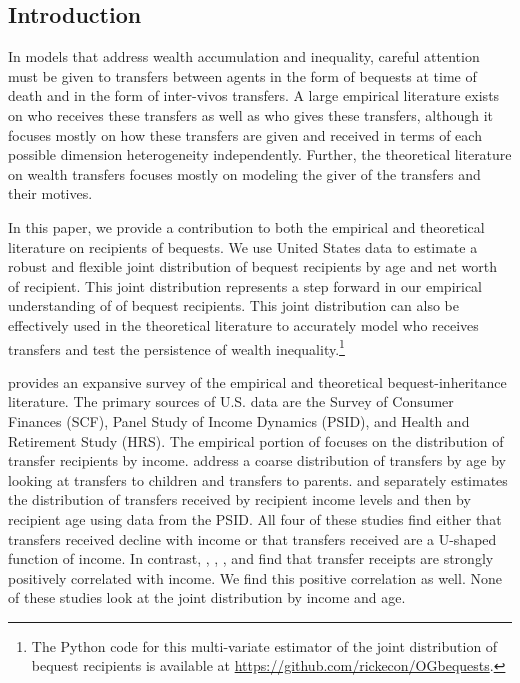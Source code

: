 \documentclass[letterpaper,12pt]{article}
\theoremstyle{definition}
\begin{document}
\begin{spacing}{1.5}

\section{Introduction}\label{SecIntro}

  In models that address wealth accumulation and inequality, careful attention must be given to transfers between agents in the form of bequests at time of death and in the form of inter-vivos transfers. A large empirical literature exists on who receives these transfers as well as who gives these transfers, although it focuses mostly on how these transfers are given and received in terms of each possible dimension heterogeneity independently. Further, the theoretical literature on wealth transfers focuses mostly on modeling the giver of the transfers and their motives.

  In this paper, we provide a contribution to both the empirical and theoretical literature on recipients of bequests. We use United States data to estimate a robust and flexible joint distribution of bequest recipients by age and net worth of recipient. This joint distribution represents a step forward in our empirical understanding of of bequest recipients. This joint distribution can also be effectively used in the theoretical literature to accurately model who receives transfers and test the persistence of wealth inequality.\footnote{The Python code for this multi-variate estimator of the joint distribution of bequest recipients is available at \href{https://github.com/rickecon/OGbequests}{https://github.com/rickecon/OGbequests}.}

  \citet{Wolff:2015} provides an expansive survey of the empirical and theoretical bequest-inheritance literature. The primary sources of U.S. data are the Survey of Consumer Finances (SCF), Panel Study of Income Dynamics (PSID), and Health and Retirement Study (HRS). The empirical portion of \citet{AltonjiEtAl:1997} focuses on the distribution of transfer recipients by income. \citet{McGarrySchoeni:1995} address a coarse distribution of transfers by age by looking at transfers to children and transfers to parents. \citet{Schoeni:1997} and \citet{WolffEtAl:2007} separately estimates the distribution of transfers received by recipient income levels and then by recipient age using data from the PSID. All four of these studies find either that transfers received decline with income or that transfers received are a U-shaped function of income. In contrast, \citet{Cox:1987}, \citet{CoxRank:1992}, \citet{Zissim:2001}, and \citet{Wolff:2015} find that transfer receipts are strongly positively correlated with income. We find this positive correlation as well. None of these studies look at the joint distribution by income and age.


\end{spacing}
\end{document}

